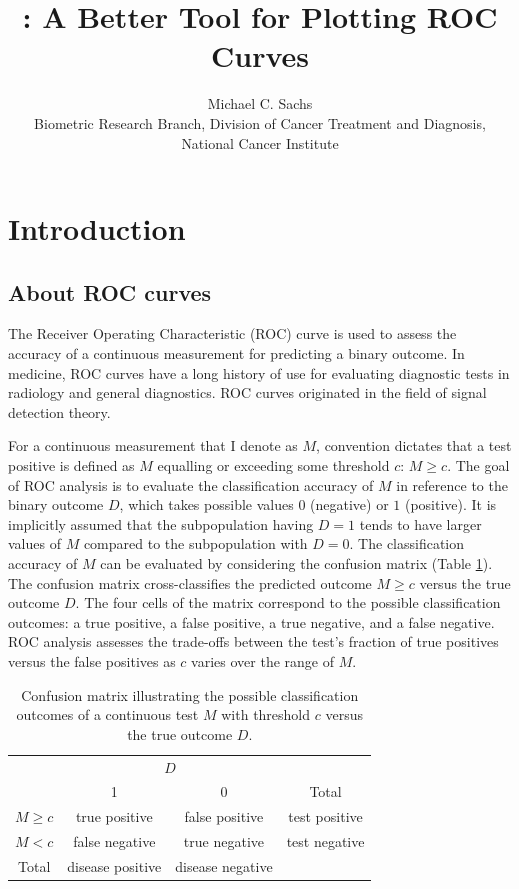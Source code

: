 \documentclass[codesnippet]{jss}
\author{		Michael C. Sachs\\Biometric Research Branch, Division of Cancer Treatment and Diagnosis,
National Cancer Institute		}
\title{\pkg{plotROC}: A Better Tool for Plotting ROC Curves}
\begin{document}
\section{Introduction}\label{introduction}

\subsection{About ROC curves}\label{about-roc-curves}

The Receiver Operating Characteristic (ROC) curve is used to assess the
accuracy of a continuous measurement for predicting a binary outcome. In
medicine, ROC curves have a long history of use for evaluating
diagnostic tests in radiology and general diagnostics. ROC curves
originated in the field of signal detection theory.

For a continuous measurement that I denote as \(M\), convention dictates
that a test positive is defined as \(M\) equalling or exceeding some
threshold \(c\): \(M \geq c\). The goal of ROC analysis is to evaluate
the classification accuracy of \(M\) in reference to the binary outcome
\(D\), which takes possible values \(0\) (negative) or \(1\) (positive).
It is implicitly assumed that the subpopulation having \(D = 1\) tends
to have larger values of \(M\) compared to the subpopulation with
\(D = 0\). The classification accuracy of \(M\) can be evaluated by
considering the confusion matrix (Table \ref{confus}). The confusion
matrix cross-classifies the predicted outcome \(M \geq c\) versus the
true outcome \(D\). The four cells of the matrix correspond to the
possible classification outcomes: a true positive, a false positive, a
true negative, and a false negative. ROC analysis assesses the
trade-offs between the test's fraction of true positives versus the
false positives as \(c\) varies over the range of \(M\).

\begin{table}
\begin{tabular}{l|c|c|c}
\multicolumn{1}{c}{}&\multicolumn{2}{c}{$D$}&\\
\cline{2-3}
\multicolumn{1}{c|}{}&1&0&\multicolumn{1}{c}{Total}\\
\cline{2-3}
 $M \geq c$ & true positive & false positive & test positive\\
\cline{2-3}
 $M < c$ & false negative & true negative & test negative\\
\cline{2-3}
\multicolumn{1}{c}{Total} & \multicolumn{1}{c}{disease positive} & \multicolumn{1}{c}{disease negative} & \multicolumn{1}{c}{}\\
\end{tabular}
\caption{\label{confus} Confusion matrix illustrating the possible classification outcomes of a continuous test $M$ with threshold $c$ versus the true outcome $D$. }
\end{table}
\end{document}
